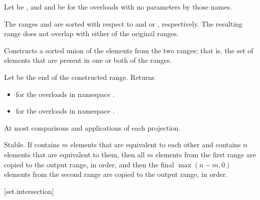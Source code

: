 \begin{itemdescr}
\pnum
Let  be ,
and  and  be 
for the overloads with no parameters by those names.

\pnum
\expects
The ranges  and  are sorted
with respect to  and  or , respectively.
The resulting range does not overlap with either of the original ranges.

\pnum
\effects
Constructs a sorted union of the elements from the two ranges;
that is, the set of elements that are present in one or both of the ranges.

\pnum
\returns
Let  be the end of the constructed range.
Returns
\begin{itemize}
\item
  for the overloads in namespace .
\item
  for the overloads in namespace .
\end{itemize}

\pnum
\complexity
At most 
comparisons and applications of each projection.

\pnum
\remarks
Stable.
If  contains $m$ elements
that are equivalent to each other and
 contains $n$ elements
that are equivalent to them,
then all $m$ elements from the first range
are copied to the output range, in order, and
then the final $\max(n - m, 0)$ elements from the second range
are copied to the output range, in order.
\end{itemdescr}

[set.intersection]{}

